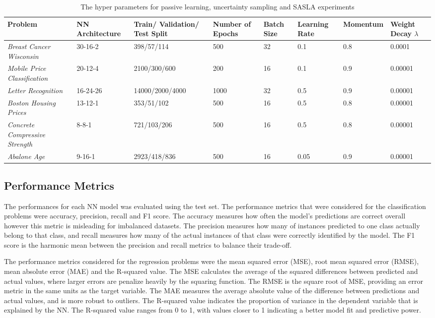 \documentclass[conference]{IEEEtran}
\begin{document}
	\begin{table}[!t]
		\centering
		\caption{The hyper parameters for passive learning, uncertainty sampling and SASLA experiments}
		\label{tab:hyperparameters}
		\begin{tabular}{L{3cm}L{1.8cm}L{2.5cm}L{1.5cm}L{1.5cm}L{1.5cm}L{1.5cm}L{1.5cm}}
			\hline
			\textbf{Problem} & \textbf{NN Architecture} & \textbf{Train/ Validation/ Test Split} & \textbf{Number of Epochs} & \textbf{Batch Size} & \textbf{Learning Rate} & \textbf{Momentum} & \textbf{Weight Decay $\lambda$} \\
			\hline
			\textit{Breast Cancer Wisconsin} & 30-16-2 & 398/57/114 & 500 & 32 & 0.1 & 0.8 & 0.0001 \\
			\textit{Mobile Price Classification} & 20-12-4 & 2100/300/600 & 200 & 16 & 0.1 & 0.9 & 0.00001 \\
			\textit{Letter Recognition} & 16-24-26 & 14000/2000/4000 & 1000 & 32 & 0.5 & 0.9 & 0.00001 \\
			\textit{Boston Housing Prices} & 13-12-1 & 353/51/102 & 500 & 16 & 0.5 & 0.8 & 0.00001 \\
			\textit{Concrete Compressive Strength} & 8-8-1 & 721/103/206 & 500 & 16 & 0.5 & 0.8 & 0.00001 \\
			\textit{Abalone Age} & 9-16-1 & 2923/418/836 & 500 & 16 & 0.05 & 0.9 & 0.00001 \\ 
			\hline
		\end{tabular}
	\end{table}
	
	\subsection{Performance Metrics}
	The performances for each NN model was evaluated using the test set. The performance metrics that were considered for the classification problems were accuracy, precision, recall and F1 score. The accuracy measures how often the model's predictions are correct overall however this metric is misleading for imbalanced datasets. The precision measures how many of instances predicted to one class actually belong to that class, and recall measures how many of the actual instances of that class were correctly identified by the model. The F1 score is the harmonic mean between the precision and recall metrics to balance their trade-off.
	
	The performance metrics considered for the regression problems were the mean squared error (MSE), root mean squared error (RMSE), mean absolute error (MAE) and the R-squared value. The MSE calculates the average of the squared differences between predicted and actual values, where larger errors are penalize heavily by the squaring function. The RMSE is the square root of MSE, providing an error metric in the same units as the target variable. The MAE measures the average absolute value of the difference between predictions and actual values, and is more robust to outliers. The R-squared value indicates the proportion of variance in the dependent variable that is explained by the NN. The R-squared value ranges from 0 to 1, with values closer to 1 indicating a better model fit and predictive power.
	
\end{document}
